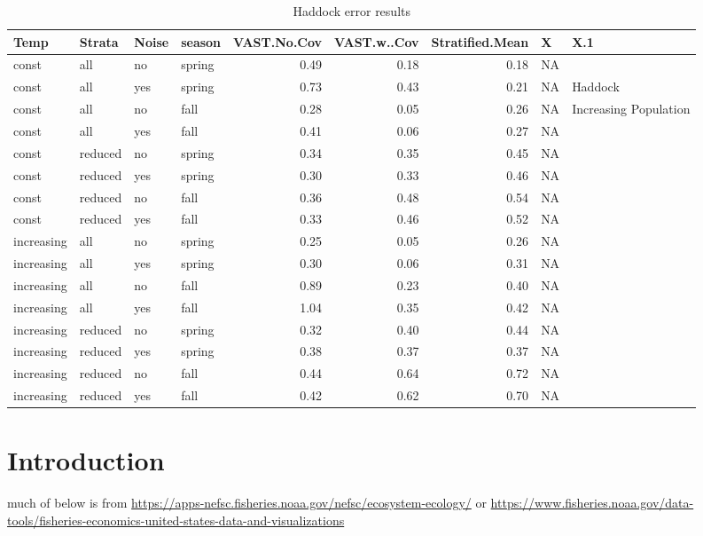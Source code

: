 \documentclass[
  12pt,
]{article}
\begin{document}
\begin{table}

\caption{\label{tab:unnamed-chunk-1}Haddock error results}
\centering
\begin{tabular}[t]{l|l|l|l|r|r|r|l|l}
\hline
Temp & Strata & Noise & season & VAST.No.Cov & VAST.w..Cov & Stratified.Mean & X & X.1\\
\hline
const & all & no & spring & 0.49 & 0.18 & 0.18 & NA & \\
\hline
const & all & yes & spring & 0.73 & 0.43 & 0.21 & NA & Haddock\\
\hline
const & all & no & fall & 0.28 & 0.05 & 0.26 & NA & Increasing Population\\
\hline
const & all & yes & fall & 0.41 & 0.06 & 0.27 & NA & \\
\hline
const & reduced & no & spring & 0.34 & 0.35 & 0.45 & NA & \\
\hline
const & reduced & yes & spring & 0.30 & 0.33 & 0.46 & NA & \\
\hline
const & reduced & no & fall & 0.36 & 0.48 & 0.54 & NA & \\
\hline
const & reduced & yes & fall & 0.33 & 0.46 & 0.52 & NA & \\
\hline
increasing & all & no & spring & 0.25 & 0.05 & 0.26 & NA & \\
\hline
increasing & all & yes & spring & 0.30 & 0.06 & 0.31 & NA & \\
\hline
increasing & all & no & fall & 0.89 & 0.23 & 0.40 & NA & \\
\hline
increasing & all & yes & fall & 1.04 & 0.35 & 0.42 & NA & \\
\hline
increasing & reduced & no & spring & 0.32 & 0.40 & 0.44 & NA & \\
\hline
increasing & reduced & yes & spring & 0.38 & 0.37 & 0.37 & NA & \\
\hline
increasing & reduced & no & fall & 0.44 & 0.64 & 0.72 & NA & \\
\hline
increasing & reduced & yes & fall & 0.42 & 0.62 & 0.70 & NA & \\
\hline
\end{tabular}
\end{table}

\newpage

\section{Introduction}

much of below is from \url{https://apps-nefsc.fisheries.noaa.gov/nefsc/ecosystem-ecology/}
or
\url{https://www.fisheries.noaa.gov/data-tools/fisheries-economics-united-states-data-and-visualizations}
\end{document}
